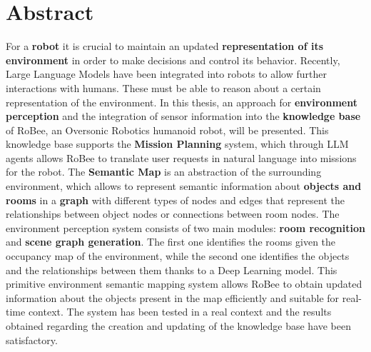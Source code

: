 \chapter*{Abstract}
For a \textbf{robot} it is crucial to maintain an updated \textbf{representation of its environment} in order to make decisions and control its behavior. Recently, Large Language Models have been integrated into robots to allow further interactions with humans. These must be able to reason about a certain representation of the environment.
In this thesis, an approach for \textbf{environment perception} and the integration of sensor information into the \textbf{knowledge base} of RoBee, an Oversonic Robotics humanoid robot, will be presented. This knowledge base supports the \textbf{Mission Planning} system, which through LLM agents allows RoBee to translate user requests in natural language into missions for the robot.
The \textbf{Semantic Map} is an abstraction of the surrounding environment, which allows to represent semantic information about \textbf{objects and rooms} in a \textbf{graph} with different types of nodes and edges that represent the relationships between object nodes or connections between room nodes.
The environment perception system consists of two main modules: \textbf{room recognition} and \textbf{scene graph generation}. The first one identifies the rooms given the occupancy map of the environment, while the second one identifies the objects and the relationships between them thanks to a Deep Learning model.
This primitive environment semantic mapping system allows RoBee to obtain updated information about the objects present in the map efficiently and suitable for real-time context.
The system has been tested in a real context and the results obtained regarding the creation and updating of the knowledge base have been satisfactory.